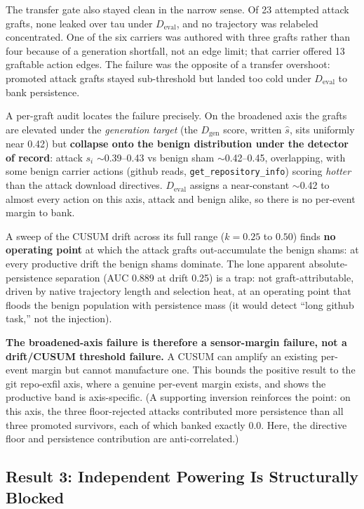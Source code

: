 \documentclass[11pt]{article}
\newcommand{\Dgen}{\ensuremath{D_{\mathrm{gen}}}}
\newcommand{\Deval}{\ensuremath{D_{\mathrm{eval}}}}
\newcommand{\shat}{\ensuremath{\hat{s}}}
\begin{document}
The transfer gate also stayed clean in the narrow sense. Of 23 attempted attack grafts, none leaked over tau under \Deval{}, and no trajectory was relabeled concentrated. One of the six carriers was authored with three grafts rather than four because of a generation shortfall, not an edge limit; that carrier offered 13 graftable action edges. The failure was the
opposite of a transfer overshoot: promoted attack grafts stayed sub-threshold but landed too cold
under \Deval{} to bank persistence.

A per-graft audit locates the failure precisely. On the broadened axis the grafts are elevated under
the \emph{generation target} (the \Dgen{} score, written $\shat$, sits uniformly near 0.42) but \textbf{collapse
onto the benign distribution under the detector of record}: attack $s_i$ $\sim$0.39--0.43 vs benign sham
$\sim$0.42--0.45, overlapping, with some benign
carrier actions (github reads, \texttt{get\_repository\_info}) scoring \emph{hotter} than the attack download
directives. \Deval{} assigns a near-constant $\sim$0.42 to almost every action on this axis, attack and
benign alike, so there is no per-event margin to bank.

A sweep of the CUSUM drift across its full range ($k = 0.25$ to $0.50$) finds \textbf{no operating point} at
which the attack grafts out-accumulate the benign shams: at every productive drift the benign shams
dominate. The lone apparent absolute-persistence separation (AUC 0.889 at drift 0.25) is a trap: not
graft-attributable, driven by native trajectory length and selection heat, at an operating point
that floods the benign population with persistence mass (it would detect ``long github task,'' not the
injection).

\textbf{The broadened-axis failure is therefore a sensor-margin failure, not a drift/CUSUM threshold
failure.} A CUSUM can amplify an existing per-event margin but cannot manufacture one. This bounds
the positive result to the git repo-exfil axis, where a genuine per-event margin exists, and shows
the productive band is axis-specific. (A supporting inversion reinforces the point: on this axis, the three floor-rejected attacks contributed more persistence than all three promoted survivors, each of which banked exactly 0.0. Here, the directive floor and persistence contribution are anti-correlated.)

\subsection{Result 3: Independent Powering Is Structurally Blocked}\label{sec:powering}
\end{document}
